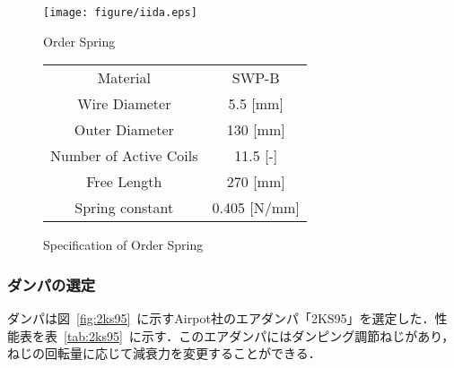 \documentclass[a4paper,12pt]{article_vdlab_sotsuron}
\begin{document}
\vspace*{10mm}
\begin{figure}[htp]
  \begin{minipage}{0.5\textwidth}
    \begin{center}
      \texttt{[image: figure/iida.eps]}
      \vspace*{3mm}
      \caption{Order Spring}
      \label{fig:iida}
    \end{center}
  \end{minipage}
  \begin{minipage}{0.5\textwidth}
      \begin{center}
	\makeatletter
	\def\@captype{table}   
	\makeatother
	\caption{Specification of Order Spring}
	\label{tab:iida}
	  \begin{tabular}{cc}\hline
	    Material & SWP-B \\
	    Wire Diameter & 5.5 [mm] \\
	    Outer Diameter & 130 [mm] \\
	    Number of Active Coils & 11.5 [-] \\
	    Free Length & 270 [mm] \\
	    Spring constant & 0.405 [N/mm] \\\hline
	  \end{tabular}  
	\end{center}
  \end{minipage}
\end{figure}

\vspace*{10mm}
\subsubsection{ダンパの選定}
ダンパは図~\ref{fig:2ks95}~に示すAirpot社のエアダンパ「2KS95」を選定した．性能表を表~\ref{tab:2ks95}~に示す．このエアダンパにはダンピング調節ねじがあり，ねじの回転量に応じて減衰力を変更することができる．
\end{document}
